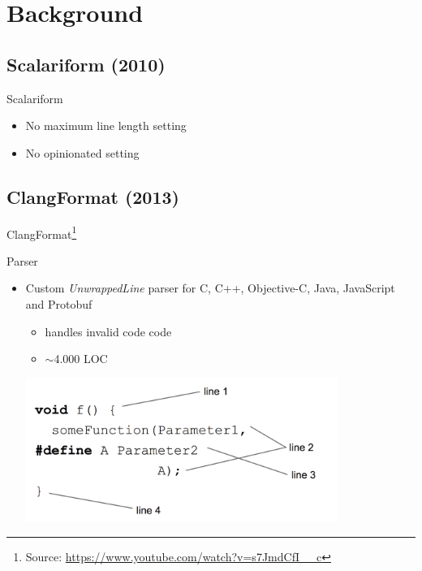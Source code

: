 \documentclass[xcolor=dvipsnames]{beamer}
\theoremstyle{definition}
\begin{document}
\section{Background} %
\label{sec:Background}
\subsection{Scalariform (2010)}

\begin{frame}{Scalariform}
  \begin{itemize}
    \item No maximum line length setting
    \item No opinionated setting
  \end{itemize}
\end{frame}

\subsection{ClangFormat (2013)}

\begin{frame}{}
  \begin{center}
    \Huge ClangFormat\footnote{Source: \url{https://www.youtube.com/watch?v=s7JmdCfI__c}}
  \end{center}
\end{frame}
\begin{frame}{Parser}
  \begin{itemize}
    \item Custom \emph{UnwrappedLine} parser for C, C++, Objective-C, Java,
      JavaScript and Protobuf
      \begin{itemize}
        \item handles invalid code code
        \item $\sim$4.000 LOC
      \end{itemize}
      \begin{center}
        \includegraphics[width=0.8\textwidth]{img/unwrapped.png}
      \end{center}
  \end{itemize}
\end{frame}
\end{document}
